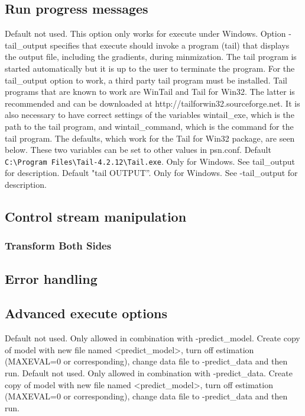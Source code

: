 \subsection{Run progress messages}

\begin{optionlist}
Default not used. This option only works for execute under Windows. Option -tail\_output specifies that execute should invoke a program (tail) 
that displays the output file, including the gradients, during minmization. The tail program is started automatically but it is up to the user to 
terminate the program. For the tail\_output option to work, a third party tail program must be installed. Tail programs that are known to work 
are WinTail and Tail for Win32.  The latter is recommended and can be downloaded at http://tailforwin32.sourceforge.net. It is also necessary 
to have correct settings of the variables wintail\_exe, which is the path to the tail program, and wintail\_command, which is the command for 
the tail program. The defaults, which work for the Tail for Win32 package, are seen below. These two variables can be set to other values in 
psn.conf.
\nextopt
{}
Default \verb|C:\Program Files\Tail-4.2.12\Tail.exe|. Only for Windows. See tail\_output for description.
\nextopt
{}
Default "tail OUTPUT”. Only for Windows. See -tail\_output for description.
\nextopt
\end{optionlist}

\subsection{Control stream manipulation}

\subsubsection{Transform Both Sides}


\subsection{Error handling}



\subsection{Advanced execute options}
\begin{optionlist}
Default not used. 
Only allowed in combination with -predict\_model.
Create copy of model with new file named <predict\_model>, turn off estimation 
(MAXEVAL=0 or corresponding), change data file to -predict\_data and then run.
Default not used. 
Only allowed in combination with -predict\_data.
Create copy of model with new file named <predict\_model>, turn off estimation 
(MAXEVAL=0 or corresponding), change data file to -predict\_data and then run.
\nextopt
\end{optionlist}



